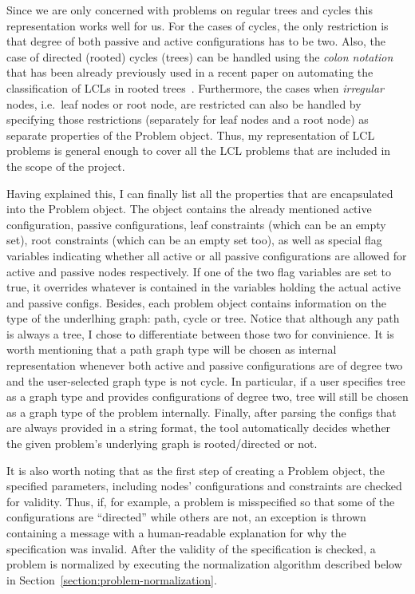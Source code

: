 Since we are only concerned with problems on regular trees and cycles
this representation works well for us. For the cases of cycles,
the only restriction is that degree of both passive and
active configurations has to be two. Also, the case
of directed (rooted) cycles (trees) can be handled
using the \emph{colon notation} that has been already
previously used in a recent paper on automating
the classification of LCLs in rooted trees~\cite{Balliu2021}.
Furthermore, the cases when \emph{irregular} nodes, i.e.\ leaf
nodes or root node, are restricted can also
be handled by specifying those restrictions
(separately for leaf nodes and a root node)
as separate properties of the Problem object.
Thus, my representation of LCL problems is general
enough to cover all the LCL problems that are
included in the scope of the project.

Having explained this, I can finally list all the
properties that are encapsulated into the
Problem object. The object contains the already
mentioned active configuration, passive configurations,
leaf constraints (which can be an empty set), root constraints
(which can be an empty set too), as well as special flag variables
indicating whether all active or all passive configurations
are allowed for active and passive nodes respectively.
If one of the two flag variables are set to true,
it overrides whatever is contained in the variables
holding the actual active and passive configs.
Besides, each problem object contains information
on the type of the underlhing graph: path, cycle or
tree. Notice that although any path is always a tree,
I chose to differentiate between those two
for convinience. It is worth mentioning that
a path graph type will be chosen as internal
representation whenever both active and
passive configurations are of degree two and
the user-selected graph type is not cycle.
In particular, if a user specifies tree as a graph
type and provides configurations of degree two,
tree will still be chosen as a graph type of the problem
internally. Finally, after parsing the configs
that are always provided in a string format,
the tool automatically decides whether the given problem's
underlying graph is rooted/directed or not.

It is also worth noting that as the first step of
creating a Problem object, the specified parameters,
including nodes' configurations and constraints
are checked for validity. Thus, if, for example,
a problem is misspecified so that some of the
configurations are ``directed'' while others are not,
an exception is thrown containing a message with
a human-readable explanation for why the
specification was invalid. After the validity
of the specification is checked, a problem is
normalized by executing the normalization algorithm
described below in Section~\ref{section:problem-normalization}.

